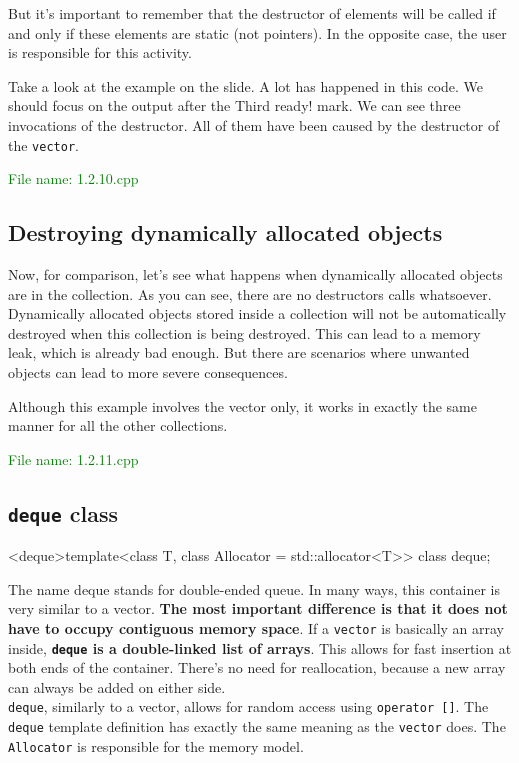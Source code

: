 But it’s important to remember that the destructor of elements will be called if and only if these 
elements are static (not pointers). In the opposite case, the user is responsible for this activity.

Take a look at the example on the slide. A lot has happened in this code. We should focus on the output 
after the Third ready! mark. We can see three invocations of the destructor. All of them have been caused 
by the destructor of the \texttt{vector}.

\textcolor{green}{File name: 1.2.10.cpp}


\subsection{Destroying dynamically allocated objects} %
Now, for comparison, let’s see what happens when dynamically allocated objects are in the collection.
As you can see, there are no destructors calls whatsoever. Dynamically allocated objects stored inside 
a collection will not be automatically destroyed when this collection is being destroyed. This can lead 
to a memory leak, which is already bad enough. But there are scenarios where unwanted objects can lead 
to more severe consequences.

Although this example involves the vector only, it works in exactly the same manner for all the other collections.

\textcolor{green}{File name: 1.2.11.cpp}


\subsection{\texttt{deque} class} %

\begin{classinfo}
  {<deque>}{template<class T, class Allocator = std::allocator<T>> class deque;}
\end{classinfo}
The name deque stands for double-ended queue. In many ways, this container is very similar to a vector.
\textbf{The most important difference is that it does not have to occupy contiguous memory space}. 
If a \texttt{vector} is basically an array inside, \textbf{\texttt{deque} is a double-linked list of arrays}. 
This allows for fast insertion at both ends of the container. There’s no need for reallocation, because 
a new array can always be added on either side. \\
\texttt{deque}, similarly to a vector, allows for random access using \texttt{operator []}. 
The \texttt{deque} template definition has exactly the same meaning as the \texttt{vector} does. 
The \texttt{Allocator} is responsible for the memory model.

